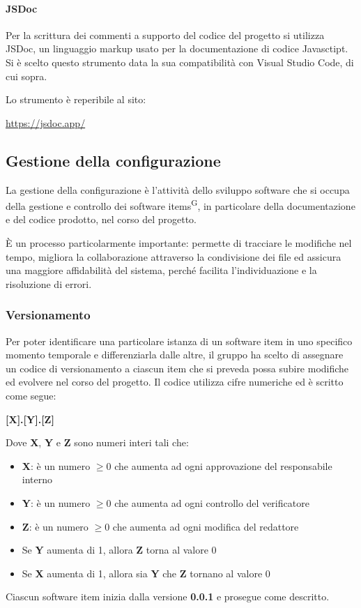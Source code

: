 \paragraph{JSDoc}
Per la scrittura dei commenti a supporto del codice del progetto si utilizza JSDoc, un linguaggio markup usato per la documentazione di codice Javasctipt. Si è scelto questo strumento data la sua compatibilità con Visual Studio Code, di cui sopra.
\par Lo strumento è reperibile al sito:
\begin{center}
    \url{https://jsdoc.app/}
\end{center}



\subsection{Gestione della configurazione}\label{sec:processi_di_supporto:gestione_configurazione}
La gestione della configurazione è l'attività dello sviluppo software che si occupa della gestione e controllo dei software items\textsuperscript{G}, in particolare della documentazione e del codice prodotto, nel corso del progetto.
\par È un processo particolarmente importante: permette di tracciare le modifiche nel tempo, migliora la collaborazione attraverso la condivisione dei file ed assicura una maggiore affidabilità del sistema, perché facilita l'individuazione e la risoluzione di errori.
\subsubsection{Versionamento}
Per poter identificare una particolare istanza di un software item in uno specifico momento temporale e differenziarla dalle altre, il gruppo ha scelto di assegnare un codice di versionamento a ciascun item che si preveda possa subire modifiche ed evolvere nel corso del progetto. Il codice utilizza cifre numeriche ed è scritto come segue:
\begin{center}
    \textbf{[X].[Y].[Z]}
\end{center}
Dove \textbf{X}, \textbf{Y} e \textbf{Z} sono numeri interi tali che:
\begin{itemize}
    \item \textbf{X}: è un numero $ \geq 0 $ che aumenta ad ogni approvazione del responsabile interno
    \item \textbf{Y}: è un numero $ \geq 0 $ che aumenta ad ogni controllo del verificatore
    \item \textbf{Z}: è un numero $ \geq 0 $ che aumenta ad ogni modifica del redattore
    \item Se \textbf{Y} aumenta di 1, allora \textbf{Z} torna al valore 0
    \item Se \textbf{X} aumenta di 1, allora sia \textbf{Y} che \textbf{Z} tornano al valore 0
\end{itemize}
Ciascun software item inizia dalla versione \textbf{0.0.1} e prosegue come descritto.
